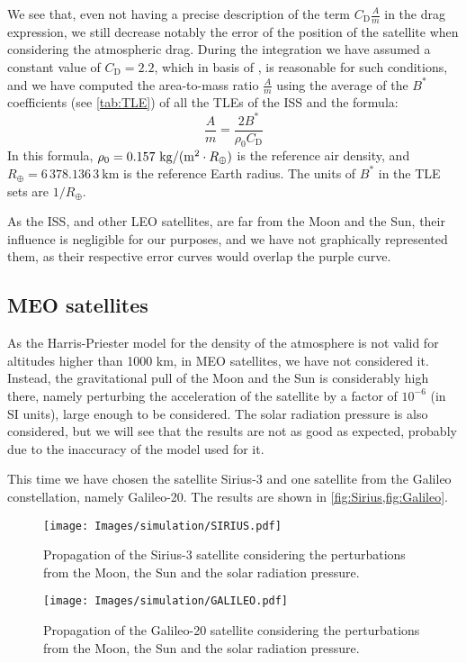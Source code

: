 \documentclass[../main.tex]{subfiles}
\begin{document}
We see that, even not having a precise description of the term $C_\mathrm{D}\frac{A}{m}$ in the drag expression, we still decrease notably the error of the position of the satellite when considering the atmospheric drag. During the integration we have assumed a constant value of $C_\mathrm{D}=2.2$, which in basis of \cite{montenbruck}, is reasonable for such conditions, and we have computed the area-to-mass ratio $\frac{A}{m}$ using the average of the $B^*$ coefficients (see \cref{tab:TLE}) of all the TLEs of the ISS and the formula:
\begin{equation}
  \frac{A}{m}=\frac{2 B^*}{\rho_0 C_\mathrm{D}}
\end{equation}
In this formula, $\rho_0=0.157\ \mathrm{kg}/(\mathrm{m}^2 \cdot R_\oplus)$ is the reference air density, and $R_\oplus=6\,378.136\,3\ \mathrm{km}$ is the reference Earth radius. The units of $B^*$ in the TLE sets are $1 / R_\oplus$.

As the ISS, and other LEO satellites, are far from the Moon and the Sun, their influence is negligible for our purposes, and we have not graphically represented them, as their respective error curves would overlap the purple curve.

\subsection{MEO satellites}
As the Harris-Priester model for the density of the atmosphere is not valid for altitudes higher than 1000 km, in MEO satellites, we have not considered it. Instead, the gravitational pull of the Moon and the Sun is considerably high there, namely perturbing the acceleration of the satellite by a factor of $10^{-6}$ (in SI units), large enough to be considered. The solar radiation pressure is also considered, but we will see that the results are not as good as expected, probably due to the inaccuracy of the model used for it.

This time we have chosen the satellite Sirius-3 and one satellite from the Galileo constellation, namely Galileo-20. The results are shown in \cref{fig:Sirius,fig:Galileo}.
\begin{figure}[ht]
  \centering
  \begin{minipage}[ht]{0.45\textwidth}
    \centering
    \texttt{[image: Images/simulation/SIRIUS.pdf]}
    \caption{Propagation of the Sirius-3 satellite considering the perturbations from the Moon, the Sun and the solar radiation pressure.}
    \label{fig:Sirius}
  \end{minipage}
  \hspace{0.0333333\textwidth}
  \begin{minipage}[ht]{0.45\textwidth}
    \centering
    \texttt{[image: Images/simulation/GALILEO.pdf]}
    \caption{Propagation of the Galileo-20 satellite considering the perturbations from the Moon, the Sun and the solar radiation pressure.}
    \label{fig:Galileo}
  \end{minipage}
\end{figure}
\end{document}
